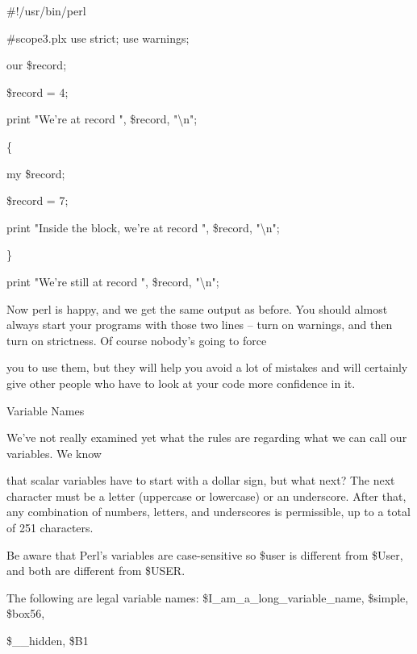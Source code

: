 \documentclass[a4paper,11pt]{book}
\begin{document}
\noindent \#!/usr/bin/perl

\noindent \#scope3.plx use strict; use warnings;

\noindent our \$record;

\noindent \$record = 4;

\noindent print "We're at record ", \$record, "\textbackslash n";

\noindent 

\noindent \{

\noindent my \$record;

\noindent \$record = 7;

\noindent print "Inside the block, we're at record ", \$record, "\textbackslash n";

\noindent \}

\noindent 

\noindent print "We're still at record ", \$record, "\textbackslash n";

\noindent 

\noindent Now perl is happy, and we get the same output as before. You should almost always start your programs with those two lines -- turn on warnings, and then turn on strictness. Of course nobody's going to force

\noindent you to use them, but they will help you avoid a lot of mistakes and will certainly give other people who have to look at your code more confidence in it.

\noindent 

\noindent Variable Names

\noindent 

\noindent We've not really examined yet what the rules are regarding what we can call our variables. We know

\noindent that scalar variables have to start with a dollar sign, but what next? The next character must be a letter (uppercase or lowercase) or an underscore. After that, any combination of numbers, letters, and underscores is permissible, up to a total of 251 characters.

\noindent 

\noindent Be aware that Perl's variables are case-sensitive so \$user is different from \$User, and both are different from \$USER.

\noindent 

\noindent The following are legal variable names: \$I\_am\_a\_long\_variable\_name, \$simple, \$box56,

\noindent \$\_\_hidden, \$B1
\end{document}
